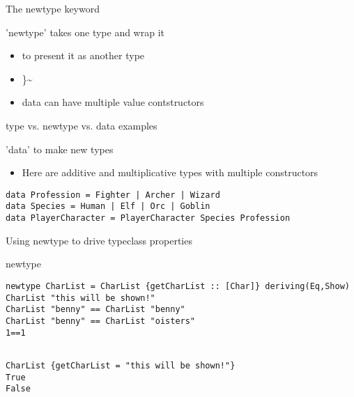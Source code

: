 \documentclass[presetation]{beamer}
\begin{document}
\begin{frame}[label={sec:org398e7f7}]{The newtype keyword}
\begin{block}{'newtype' takes one type and wrap it}
\begin{itemize}
\item to present it as another type
\item[{\textasciitilde{}newtype ZipList a = ZipList \{getZipList}] [a]\}\textasciitilde{}
\item data can have multiple value contstructors
\end{itemize}
\end{block}
\end{frame}
\begin{frame}[fragile,label={sec:org30d08f6}]{type vs. newtype vs. data examples}
 \begin{block}{'data' to make new types}
\begin{itemize}
\item Here are additive and multiplicative types with multiple constructors
\end{itemize}
\begin{verbatim}
data Profession = Fighter | Archer | Wizard
data Species = Human | Elf | Orc | Goblin
data PlayerCharacter = PlayerCharacter Species Profession
\end{verbatim}
\end{block}
\end{frame}

\begin{frame}[fragile,label={sec:orge6b2485}]{Using newtype to drive typeclass properties}
 \begin{block}{newtype}
\begin{verbatim}
newtype CharList = CharList {getCharList :: [Char]} deriving(Eq,Show)
CharList "this will be shown!"
CharList "benny" == CharList "benny"
CharList "benny" == CharList "oisters"
1==1
\end{verbatim}

\begin{verbatim}

CharList {getCharList = "this will be shown!"}
True
False
\end{verbatim}
\end{block}
\end{frame}
\end{document}
